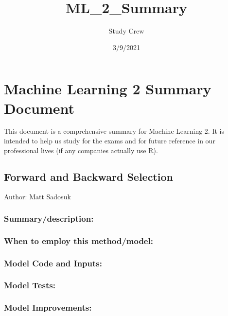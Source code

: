 \documentclass[
]{article}
\title{ML\_2\_Summary}
\author{Study Crew}
\date{3/9/2021}
\begin{document}
\maketitle

\hypertarget{machine-learning-2-summary-document}{%
\section{Machine Learning 2 Summary
Document}\label{machine-learning-2-summary-document}}

This document is a comprehensive summary for Machine Learning 2. It is
intended to help us study for the exams and for future reference in our
professional lives (if any companies actually use R).

\hypertarget{forward-and-backward-selection}{%
\subsection{Forward and Backward
Selection}\label{forward-and-backward-selection}}

Author: Matt Sadosuk

\hypertarget{summarydescription}{%
\subsubsection{Summary/description:}\label{summarydescription}}

\hypertarget{when-to-employ-this-methodmodel}{%
\subsubsection{When to employ this
method/model:}\label{when-to-employ-this-methodmodel}}

\hypertarget{model-code-and-inputs}{%
\subsubsection{Model Code and Inputs:}\label{model-code-and-inputs}}

\hypertarget{model-tests}{%
\subsubsection{Model Tests:}\label{model-tests}}

\hypertarget{model-improvements}{%
\subsubsection{Model Improvements:}\label{model-improvements}}
\end{document}
